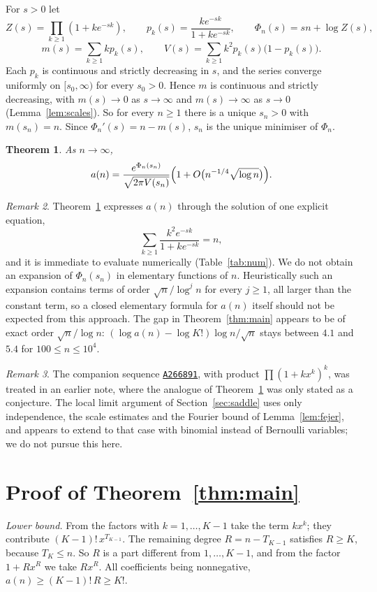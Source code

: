 \documentclass[11pt,a4paper]{article}
\newtheorem{theorem}{Theorem}
\theoremstyle{remark}
\newtheorem{remark}[theorem]{Remark}
\newcommand{\oeis}[1]{\href{https://oeis.org/#1}{\texttt{#1}}}
\begin{document}
For $s>0$ let
\[
 Z(s)=\prod_{k\ge1}(1+ke^{-sk}),\qquad p_k(s)=\frac{ke^{-sk}}{1+ke^{-sk}},\qquad \Phi_n(s)=sn+\log Z(s),
\]
\[
 m(s)=\sum_{k\ge1}kp_k(s),\qquad V(s)=\sum_{k\ge1}k^2p_k(s)\bigl(1-p_k(s)\bigr).
\]
Each $p_k$ is continuous and strictly decreasing in $s$, and the series converge uniformly on $[s_0,\infty)$ for every $s_0>0$. Hence $m$ is continuous and strictly decreasing, with $m(s)\to0$ as $s\to\infty$ and $m(s)\to\infty$ as $s\to0$ (Lemma~\ref{lem:scales}). So for every $n\ge1$ there is a unique $s_n>0$ with $m(s_n)=n$. Since $\Phi_n'(s)=n-m(s)$, $s_n$ is the unique minimiser of $\Phi_n$.

\begin{theorem}\label{thm:saddle}
As $n\to\infty$,
\[
 a(n)=\frac{e^{\Phi_n(s_n)}}{\sqrt{2\pi V(s_n)}}\Bigl(1+O\bigl(n^{-1/4}\sqrt{\log n}\bigr)\Bigr).
\]
\end{theorem}

\begin{remark}
Theorem~\ref{thm:saddle} expresses $a(n)$ through the solution of one explicit equation,
\[
 \sum_{k\ge1}\frac{k^2e^{-sk}}{1+ke^{-sk}}=n,
\]
and it is immediate to evaluate numerically (Table~\ref{tab:num}). We do not obtain an expansion of $\Phi_n(s_n)$ in elementary functions of $n$. Heuristically such an expansion contains terms of order $\sqrt n/\log^jn$ for every $j\ge1$, all larger than the constant term, so a closed elementary formula for $a(n)$ itself should not be expected from this approach. The gap in Theorem~\ref{thm:main} appears to be of exact order $\sqrt n/\log n$: $(\log a(n)-\log K!)\log n/\sqrt n$ stays between $4.1$ and $5.4$ for $100\le n\le10^4$.
\end{remark}

\begin{remark}
The companion sequence \oeis{A266891}, with product $\prod(1+kx^k)^k$, was treated in an earlier note, where the analogue of Theorem~\ref{thm:saddle} was only stated as a conjecture. The local limit argument of Section~\ref{sec:saddle} uses only independence, the scale estimates and the Fourier bound of Lemma~\ref{lem:fejer}, and appears to extend to that case with binomial instead of Bernoulli variables; we do not pursue this here.
\end{remark}

\section{Proof of Theorem~\ref{thm:main}}

\emph{Lower bound.} From the factors with $k=1,\dots,K-1$ take the term $kx^k$; they contribute $(K-1)!\,x^{T_{K-1}}$. The remaining degree $R=n-T_{K-1}$ satisfies $R\ge K$, because $T_K\le n$. So $R$ is a part different from $1,\dots,K-1$, and from the factor $1+Rx^R$ we take $Rx^R$. All coefficients being nonnegative, $a(n)\ge(K-1)!\,R\ge K!$.
\end{document}
